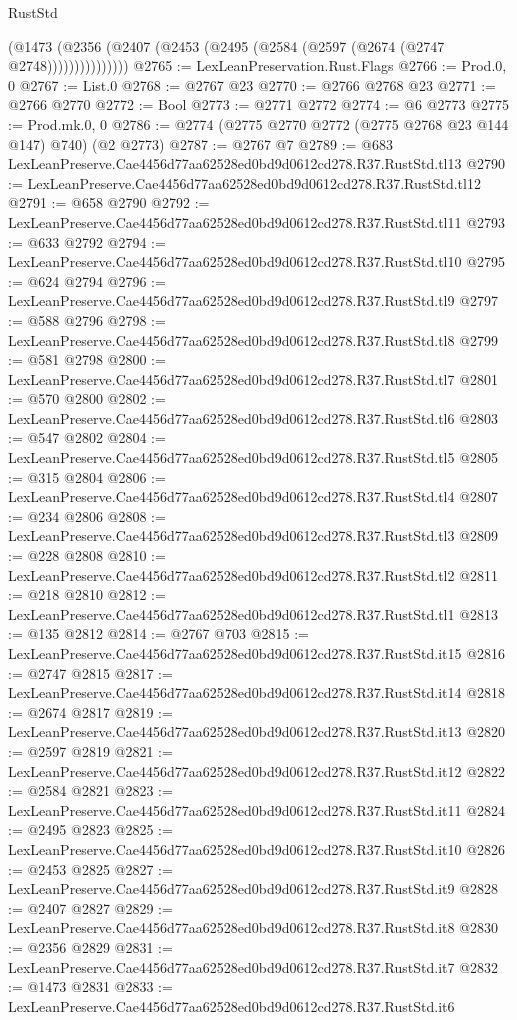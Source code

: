 \begin{lexlean}{RustStd}
\begin{coremodule}
                (@1473 (@2356 (@2407 (@2453 (@2495 (@2584 (@2597 (@2674 (@2747 @2748)))))))))))))))
@2765 := LexLeanPreservation.Rust.Flags
@2766 := Prod.{0, 0}
@2767 := List.{0}
@2768 := @2767 @23
@2770 := @2766 @2768 @23
@2771 := @2766 @2770
@2772 := Bool
@2773 := @2771 @2772
@2774 := @6 @2773
@2775 := Prod.mk.{0, 0}
@2786 := @2774 (@2775 @2770 @2772 (@2775 @2768 @23 @144 @147) @740) (@2 @2773)
@2787 := @2767 @7
@2789 := @683 LexLeanPreserve.Cae4456d77aa62528ed0bd9d0612cd278.R37.RustStd.tl13
@2790 := LexLeanPreserve.Cae4456d77aa62528ed0bd9d0612cd278.R37.RustStd.tl12
@2791 := @658 @2790
@2792 := LexLeanPreserve.Cae4456d77aa62528ed0bd9d0612cd278.R37.RustStd.tl11
@2793 := @633 @2792
@2794 := LexLeanPreserve.Cae4456d77aa62528ed0bd9d0612cd278.R37.RustStd.tl10
@2795 := @624 @2794
@2796 := LexLeanPreserve.Cae4456d77aa62528ed0bd9d0612cd278.R37.RustStd.tl9
@2797 := @588 @2796
@2798 := LexLeanPreserve.Cae4456d77aa62528ed0bd9d0612cd278.R37.RustStd.tl8
@2799 := @581 @2798
@2800 := LexLeanPreserve.Cae4456d77aa62528ed0bd9d0612cd278.R37.RustStd.tl7
@2801 := @570 @2800
@2802 := LexLeanPreserve.Cae4456d77aa62528ed0bd9d0612cd278.R37.RustStd.tl6
@2803 := @547 @2802
@2804 := LexLeanPreserve.Cae4456d77aa62528ed0bd9d0612cd278.R37.RustStd.tl5
@2805 := @315 @2804
@2806 := LexLeanPreserve.Cae4456d77aa62528ed0bd9d0612cd278.R37.RustStd.tl4
@2807 := @234 @2806
@2808 := LexLeanPreserve.Cae4456d77aa62528ed0bd9d0612cd278.R37.RustStd.tl3
@2809 := @228 @2808
@2810 := LexLeanPreserve.Cae4456d77aa62528ed0bd9d0612cd278.R37.RustStd.tl2
@2811 := @218 @2810
@2812 := LexLeanPreserve.Cae4456d77aa62528ed0bd9d0612cd278.R37.RustStd.tl1
@2813 := @135 @2812
@2814 := @2767 @703
@2815 := LexLeanPreserve.Cae4456d77aa62528ed0bd9d0612cd278.R37.RustStd.it15
@2816 := @2747 @2815
@2817 := LexLeanPreserve.Cae4456d77aa62528ed0bd9d0612cd278.R37.RustStd.it14
@2818 := @2674 @2817
@2819 := LexLeanPreserve.Cae4456d77aa62528ed0bd9d0612cd278.R37.RustStd.it13
@2820 := @2597 @2819
@2821 := LexLeanPreserve.Cae4456d77aa62528ed0bd9d0612cd278.R37.RustStd.it12
@2822 := @2584 @2821
@2823 := LexLeanPreserve.Cae4456d77aa62528ed0bd9d0612cd278.R37.RustStd.it11
@2824 := @2495 @2823
@2825 := LexLeanPreserve.Cae4456d77aa62528ed0bd9d0612cd278.R37.RustStd.it10
@2826 := @2453 @2825
@2827 := LexLeanPreserve.Cae4456d77aa62528ed0bd9d0612cd278.R37.RustStd.it9
@2828 := @2407 @2827
@2829 := LexLeanPreserve.Cae4456d77aa62528ed0bd9d0612cd278.R37.RustStd.it8
@2830 := @2356 @2829
@2831 := LexLeanPreserve.Cae4456d77aa62528ed0bd9d0612cd278.R37.RustStd.it7
@2832 := @1473 @2831
@2833 := LexLeanPreserve.Cae4456d77aa62528ed0bd9d0612cd278.R37.RustStd.it6

\end{coremodule}
\end{lexlean}
